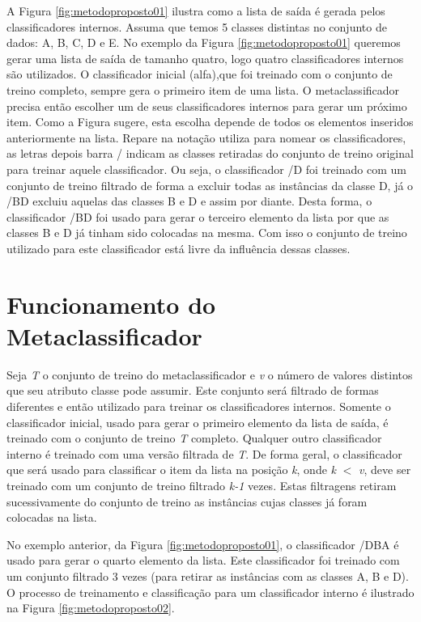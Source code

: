 A Figura \ref{fig:metodoproposto01} ilustra como a lista de saída é gerada pelos classificadores internos.
Assuma que temos 5 classes distintas no conjunto de dados: A, B, C, D e E. 
No exemplo da Figura \ref{fig:metodoproposto01} queremos gerar uma lista de saída de tamanho quatro, logo quatro classificadores internos são utilizados. 
O classificador inicial (alfa),que foi treinado com o conjunto de treino completo, sempre gera o primeiro item de uma lista. 
O metaclassificador precisa então escolher um de seus classificadores internos para gerar um próximo item. 
Como a Figura sugere, esta escolha depende de todos os elementos inseridos anteriormente na lista.
Repare na notação utiliza para nomear os classificadores, as letras depois barra / indicam as classes retiradas do conjunto de treino original para treinar aquele classificador.
Ou seja, o classificador /D foi treinado com um conjunto de treino filtrado de forma a excluir todas as instâncias da classe D, já o /BD excluiu aquelas das classes B e D e assim por diante.
Desta forma, o classificador /BD foi usado para gerar o terceiro elemento da lista por que as classes B e D já tinham sido colocadas na mesma.
Com isso o conjunto de treino utilizado para este classificador está livre da influência dessas classes.

\section{Funcionamento do Metaclassificador}

Seja \textit{T} o conjunto de treino do metaclassificador e \textit{v} o número de valores distintos que seu atributo classe pode assumir. 
Este conjunto será filtrado de formas diferentes e então utilizado para treinar os classificadores internos. 
Somente o classificador inicial, usado para gerar o primeiro elemento da lista de saída, é treinado com o conjunto de treino \textit{T} completo. 
Qualquer outro classificador interno é treinado com uma versão filtrada de  \textit{T}. 
De forma geral, o classificador que será usado para classificar o item da lista na posição \textit{k}, onde \textit{k} $<$ \textit{v}, deve ser treinado com um conjunto de treino filtrado \textit{k-1} vezes. 
Estas filtragens retiram sucessivamente do conjunto de treino as instâncias cujas classes já foram colocadas na lista.

No exemplo anterior, da Figura \ref{fig:metodoproposto01}, o classificador /DBA é usado para gerar o quarto elemento da lista.
Este classificador foi treinado com um conjunto filtrado 3 vezes (para retirar as instâncias com as classes A, B e D).
O processo de treinamento e classificação para um classificador interno é ilustrado na Figura \ref{fig:metodoproposto02}.

